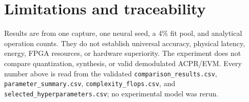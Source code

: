 \documentclass[9pt,a4paper]{extarticle}
\begin{document}
\section*{Limitations and traceability}
Results are from one capture, one neural seed, a 4\% fit pool, and analytical
operation counts.  They do not establish universal accuracy, physical
latency, energy, FPGA resources, or hardware superiority.  The experiment
does not compare quantization, synthesis, or valid demodulated ACPR/EVM.
Every number above is read from the validated
\texttt{comparison\_results.csv}, \texttt{parameter\_summary.csv},
\texttt{complexity\_flops.csv}, and
\texttt{selected\_hyperparameters.csv}; no experimental model was rerun.
\end{document}
